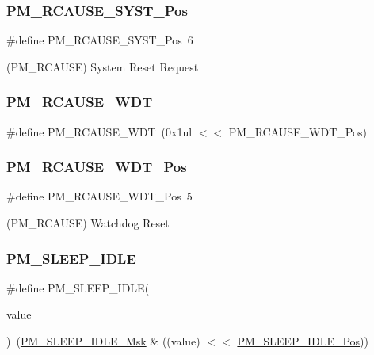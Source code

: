 \subsubsection{\texorpdfstring{PM\_RCAUSE\_SYST\_Pos}{PM\_RCAUSE\_SYST\_Pos}}
{\footnotesize\ttfamily \#define P\+M\+\_\+\+R\+C\+A\+U\+S\+E\+\_\+\+S\+Y\+S\+T\+\_\+\+Pos~6}



(P\+M\+\_\+\+R\+C\+A\+U\+SE) System Reset Request 

\mbox{\label{group___s_a_m_d21___p_m_ga2e6ddb881722d01467601fe471f3d39d}} 
\subsubsection{\texorpdfstring{PM\_RCAUSE\_WDT}{PM\_RCAUSE\_WDT}}
{\footnotesize\ttfamily \#define P\+M\+\_\+\+R\+C\+A\+U\+S\+E\+\_\+\+W\+DT~(0x1ul $<$$<$ P\+M\+\_\+\+R\+C\+A\+U\+S\+E\+\_\+\+W\+D\+T\+\_\+\+Pos)}

\mbox{\label{group___s_a_m_d21___p_m_gab0963293947ca8a4531e5a51d53438b2}} 
\subsubsection{\texorpdfstring{PM\_RCAUSE\_WDT\_Pos}{PM\_RCAUSE\_WDT\_Pos}}
{\footnotesize\ttfamily \#define P\+M\+\_\+\+R\+C\+A\+U\+S\+E\+\_\+\+W\+D\+T\+\_\+\+Pos~5}



(P\+M\+\_\+\+R\+C\+A\+U\+SE) Watchdog Reset 

\mbox{\label{group___s_a_m_d21___p_m_ga624dad2f7e3ebc6a04ec0fcdf3072de5}} 
\subsubsection{\texorpdfstring{PM\_SLEEP\_IDLE}{PM\_SLEEP\_IDLE}}
{\footnotesize\ttfamily \#define P\+M\+\_\+\+S\+L\+E\+E\+P\+\_\+\+I\+D\+LE(\begin{DoxyParamCaption}\item[{}]{value }\end{DoxyParamCaption})~(\mbox{\hyperlink{group___s_a_m_d21___p_m_ga1e037abe2f7d3bb76b2197bb252dc03a}{P\+M\+\_\+\+S\+L\+E\+E\+P\+\_\+\+I\+D\+L\+E\+\_\+\+Msk}} \& ((value) $<$$<$ \mbox{\hyperlink{group___s_a_m_d21___p_m_gaa2d182f036730a59ef2da72b5b0e618a}{P\+M\+\_\+\+S\+L\+E\+E\+P\+\_\+\+I\+D\+L\+E\+\_\+\+Pos}}))}

